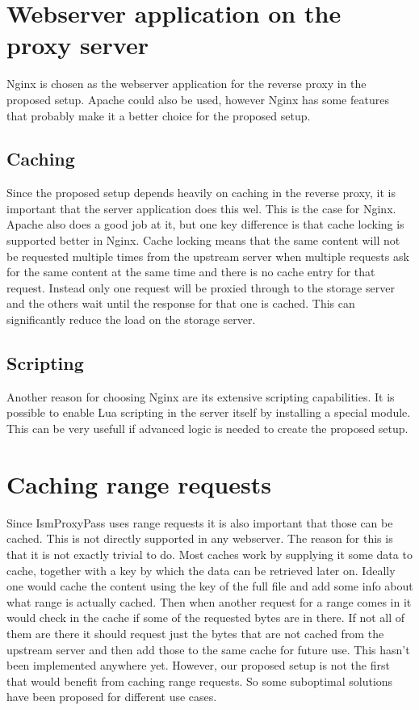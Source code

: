 \documentclass[twoside,openright]{uva-bachelor-thesis}
\begin{document}
\section{Webserver application on the proxy server}
Nginx is chosen as the webserver application for the reverse proxy in the
proposed setup. Apache could also be used, however Nginx has some features that
probably make it a better choice for the proposed setup.

\subsection{Caching}\label{sec:caching}
Since the proposed setup depends heavily on caching in the reverse proxy, it is
important that the server application does this wel. This is the case for Nginx.
Apache also does a good job at it, but one key difference is that cache locking is
supported better in Nginx. Cache locking means that the same content will not be
requested multiple times from the upstream server when multiple requests ask for
the same content at the same time and there is no cache entry for that
request. Instead only one request will be proxied through to the storage server
and the others wait until the response for that one is cached. This can
significantly reduce the load on the storage server.

\subsection{Scripting}
Another reason for choosing Nginx are its extensive scripting capabilities. It
is possible to enable Lua scripting in the server itself by installing a special
module\autocite{nginxlua}. This can be very usefull if advanced logic is needed
to create the proposed setup.


\section{Caching range requests}
Since IsmProxyPass uses range requests it is also important that those can be
cached. This is not directly supported in any webserver. The reason for
this is that it is not exactly trivial to do. Most caches work by supplying it
some data to cache, together with a key by which the data can be retrieved later
on.
Ideally one would cache the content using the key of the full file and add some
info about what range is actually cached. Then when another request for a range
comes in it would check in the cache if some of the requested bytes are in
there. If not all of them are there it should request just the bytes that are
not cached from the upstream server and then add those to the same cache for
future use. This hasn't been implemented anywhere yet. However, our proposed
setup is not the first that would benefit from caching range requests. So some
suboptimal solutions have been proposed for different use cases.
\end{document}

